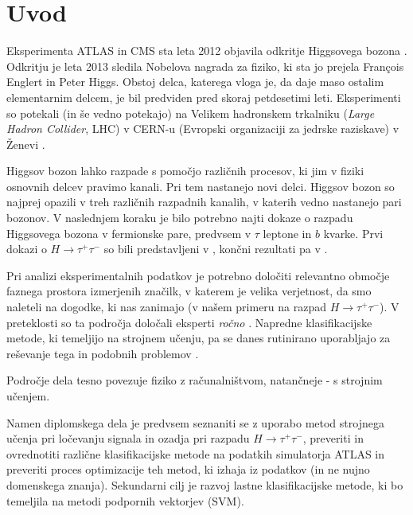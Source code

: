 \documentclass[11pt,a4paper,openany]{book}
\begin{document}
\chapter*{Uvod}

Eksperimenta ATLAS in CMS sta leta 2012 objavila odkritje Higgsovega bozona \cite{Aad20121,Chatrchyan201230}. Odkritju je leta 2013 sledila Nobelova nagrada za fiziko, ki sta jo prejela François Englert in Peter Higgs. Obstoj delca, katerega vloga je, da daje maso ostalim elementarnim delcem, je bil predviden pred skoraj petdesetimi leti. Eksperimenti so potekali (in še vedno potekajo) na Velikem hadronskem trkalniku (\textit{Large Hadron Collider}, LHC) v CERN-u (Evropski organizaciji za jedrske raziskave) v Ženevi \cite{ChallengeDoc}.

Higgsov bozon lahko razpade s pomočjo različnih procesov, ki jim v fiziki osnovnih delcev pravimo kanali. Pri tem nastanejo novi delci. Higgsov bozon so najprej opazili v treh različnih razpadnih kanalih, v katerih vedno nastanejo pari bozonov. V naslednjem koraku je bilo potrebno najti dokaze o razpadu Higgsovega bozona v fermionske pare, predvsem v $\tau$ leptone in $b$ kvarke. Prvi dokazi o $H \rightarrow \tau^+\tau^-$ so bili predstavljeni v \cite{atlas2013}, končni rezultati pa v \cite{atlas2015htautau}.

Pri analizi eksperimentalnih podatkov je potrebno določiti relevantno območje faznega prostora izmerjenih značilk, v katerem je velika verjetnost, da smo naleteli na dogodke, ki nas zanimajo (v našem primeru na razpad $H \rightarrow \tau^+\tau^-$). V preteklosti so ta področja določali eksperti \textit{ročno} \cite{Adam-Bourdarios14}. Napredne klasifikacijske metode, ki temeljijo na strojnem učenju, pa se danes rutinirano uporabljajo za reševanje tega in podobnih problemov \cite{atlas2013}.

Področje dela tesno povezuje fiziko z računalništvom, natančneje - s strojnim učenjem. 

Namen diplomskega dela je predvsem seznaniti se z uporabo metod strojnega učenja pri ločevanju signala in ozadja pri razpadu $H \rightarrow \tau^+\tau^-$, preveriti in ovrednotiti različne klasifikacijske metode na podatkih simulatorja ATLAS in preveriti proces optimizacije teh metod, ki izhaja iz podatkov (in ne nujno domenskega znanja). Sekundarni cilj je razvoj lastne klasifikacijske metode, ki bo temeljila na metodi podpornih vektorjev (SVM).
\end{document}

